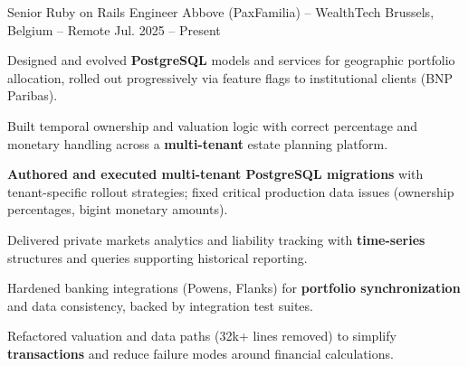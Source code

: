 
\begin{cventries}

\cventry
  {Senior Ruby on Rails Engineer}
  {Abbove (PaxFamilia) – WealthTech}
  {Brussels, Belgium – Remote}
  {Jul. 2025 – Present}
  {
    \begin{cvitems}
      \item {Designed and evolved \textbf{PostgreSQL} models and services for geographic portfolio allocation, rolled out progressively via feature flags to institutional clients (BNP Paribas).}
      \item {Built temporal ownership and valuation logic with correct percentage and monetary handling across a \textbf{multi-tenant} estate planning platform.}
      \item {\textbf{Authored and executed multi-tenant PostgreSQL migrations} with tenant-specific rollout strategies; fixed critical production data issues (ownership percentages, bigint monetary amounts).}
      \item {Delivered private markets analytics and liability tracking with \textbf{time-series} structures and queries supporting historical reporting.}
      \item {Hardened banking integrations (Powens, Flanks) for \textbf{portfolio synchronization} and data consistency, backed by integration test suites.}
      \item {Refactored valuation and data paths (32k+ lines removed) to simplify \textbf{transactions} and reduce failure modes around financial calculations.}
    \end{cvitems}
  }


\end{cventries}
